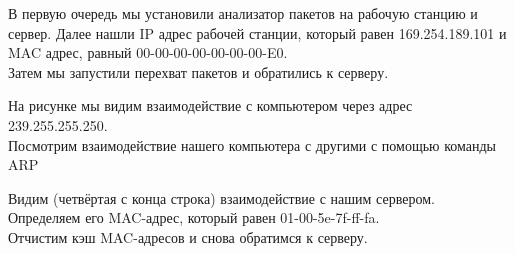 \documentclass[a4paper,12pt]{article}
\begin{document}
В первую очередь мы установили анализатор пакетов на рабочую станцию и сервер. Далее нашли IP 
адрес рабочей станции, который равен 169.254.189.101 и  MAC адрес, равный 00-00-00-00-00-00-00-E0.\\
Затем мы запустили перехват пакетов и обратились к серверу.
\begin{figure}[H]
\end{figure}

На рисунке мы видим взаимодействие с компьютером через адрес 239.255.255.250.\\
Посмотрим взаимодействие нашего компьютера с другими с помощью команды ARP 
\begin{figure}[H]
\end{figure}
Видим (четвёртая с конца строка) взаимодействие с нашим сервером.
Определяем его MAC-адрес, который равен 01-00-5e-7f-ff-fa.\\

Отчистим кэш MAC-адресов и снова обратимся к серверу.
\end{document}
